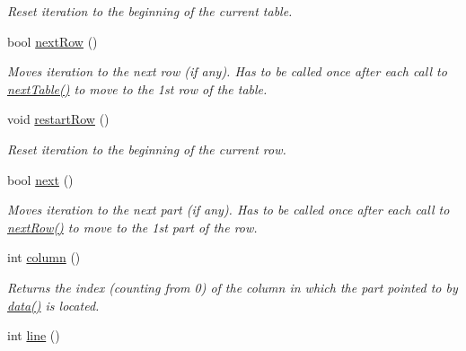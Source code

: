 \begin{DoxyCompactItemize}
\begin{DoxyCompactList}\small\item\em Reset iteration to the beginning of the current table. \end{DoxyCompactList}\item 
bool \hyperlink{classoption_1_1PrintUsageImplementation_1_1LinePartIterator_a55d5c3e50f9c1d8cd48f518899a5a48c}{next\+Row} ()
\begin{DoxyCompactList}\small\item\em Moves iteration to the next row (if any). Has to be called once after each call to \hyperlink{classoption_1_1PrintUsageImplementation_1_1LinePartIterator_afe43ca12d399ed3c871e4dc5bf63356e}{next\+Table()} to move to the 1st row of the table. \end{DoxyCompactList}\item 
void \hyperlink{classoption_1_1PrintUsageImplementation_1_1LinePartIterator_a96c448939f33a811174ea7b5addb312e}{restart\+Row} ()\hypertarget{classoption_1_1PrintUsageImplementation_1_1LinePartIterator_a96c448939f33a811174ea7b5addb312e}{}\label{classoption_1_1PrintUsageImplementation_1_1LinePartIterator_a96c448939f33a811174ea7b5addb312e}

\begin{DoxyCompactList}\small\item\em Reset iteration to the beginning of the current row. \end{DoxyCompactList}\item 
bool \hyperlink{classoption_1_1PrintUsageImplementation_1_1LinePartIterator_a58b8743da57de2d108472eee60324df6}{next} ()
\begin{DoxyCompactList}\small\item\em Moves iteration to the next part (if any). Has to be called once after each call to \hyperlink{classoption_1_1PrintUsageImplementation_1_1LinePartIterator_a55d5c3e50f9c1d8cd48f518899a5a48c}{next\+Row()} to move to the 1st part of the row. \end{DoxyCompactList}\item 
int \hyperlink{classoption_1_1PrintUsageImplementation_1_1LinePartIterator_afa41382acabcd37ca70f7e8b9994b8c0}{column} ()\hypertarget{classoption_1_1PrintUsageImplementation_1_1LinePartIterator_afa41382acabcd37ca70f7e8b9994b8c0}{}\label{classoption_1_1PrintUsageImplementation_1_1LinePartIterator_afa41382acabcd37ca70f7e8b9994b8c0}

\begin{DoxyCompactList}\small\item\em Returns the index (counting from 0) of the column in which the part pointed to by \hyperlink{classoption_1_1PrintUsageImplementation_1_1LinePartIterator_ada26229add63bd479c7877f2f8e32908}{data()} is located. \end{DoxyCompactList}\item 
int \hyperlink{classoption_1_1PrintUsageImplementation_1_1LinePartIterator_a8ad1201d95bf0bd9453a731da8c15a10}{line} ()\hypertarget{classoption_1_1PrintUsageImplementation_1_1LinePartIterator_a8ad1201d95bf0bd9453a731da8c15a10}{}\label{classoption_1_1PrintUsageImplementation_1_1LinePartIterator_a8ad1201d95bf0bd9453a731da8c15a10}


\end{DoxyCompactItemize}

